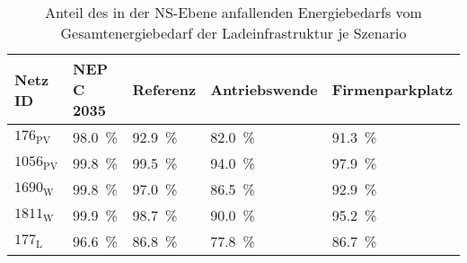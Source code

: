 {
\renewcommand{\arraystretch}{1.2}%
\begin{table}[H]
	\begin{center}
		\caption{Anteil des in der NS-Ebene anfallenden Energiebedarfs vom Gesamtenergiebedarf der Ladeinfrastruktur je Szenario}
		\begin{tabu} to 0.8\textwidth {X[0.65] X[1.1, r] X[0.8, r] X[1.2, r] X[1.4, r]}
			\toprule
			Netz ID    & NEP C \num{2035}    & Referenz            & Antriebswende       & \glqq Firmenparkplatz\grqq \\ \midrule
			\(176_{\text{PV}}\)  & \SI{98.0}{\percent} & \SI{92.9}{\percent} & \SI{82.0}{\percent} & \SI{91.3}{\percent}        \\
			\(1056_{\text{PV}}\) & \SI{99.8}{\percent} & \SI{99.5}{\percent} & \SI{94.0}{\percent} & \SI{97.9}{\percent}        \\
			\(1690_{\text{W}}\) & \SI{99.8}{\percent} & \SI{97.0}{\percent} & \SI{86.5}{\percent} & \SI{92.9}{\percent}        \\
			\(1811_{\text{W}}\) & \SI{99.9}{\percent} & \SI{98.7}{\percent} & \SI{90.0}{\percent} & \SI{95.2}{\percent}        \\
			\(177_{\text{L}}\)  & \SI{96.6}{\percent} & \SI{86.8}{\percent} & \SI{77.8}{\percent} & \SI{86.7}{\percent}        \\ \bottomrule
		\end{tabu}
		\label{tab:lvConnectionShare}
	\end{center}
	\vspace{-3mm}%
\end{table}
}